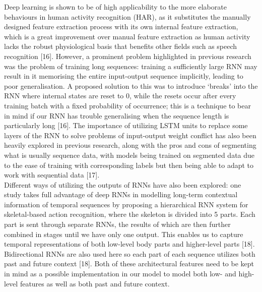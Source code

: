 \documentclass[12pt,twoside]{report}
\begin{document}
\quad Deep learning is shown to be of high applicability to the more elaborate behaviours in human activity recognition (HAR), as it substitutes the manually designed feature extraction process with its own internal feature extraction, which is a great improvement over manual feature extraction as human activity lacks the robust physiological basis that benefits other fields such as speech recognition [16]. However, a prominent problem highlighted in previous research was the problem of training long sequences: training a sufficiently large RNN may result in it memorising the entire input-output sequence implicitly, leading to poor generalisation. A proposed solution to this was to introduce ‘breaks’ into the RNN where internal states are reset to 0, while the resets occur after every training batch with a fixed probability of occurrence; this is a technique to bear in mind if our RNN has trouble generalising when the sequence length is particularly long [16]. The importance of utilizing LSTM units to replace some layers of the RNN to solve problems of input-output weight conflict has also been heavily explored in previous research, along with the pros and cons of segmenting what is usually sequence data, with models being trained on segmented data due to the ease of training with corresponding labels but then being able to adapt to work with sequential data [17].\\

\quad Different ways of utilizing the outputs of RNNs have also been explored: one study takes full advantage of deep RNNs in modelling long-term contextual information of temporal sequences by proposing a hierarchical RNN system for skeletal-based action recognition, where the skeleton is divided into 5 parts. Each part is sent through separate RNNs, the results of which are then further combined in stages until we have only one output. This enables us to capture temporal representations of both low-level body parts and higher-level parts [18]. Bidirectional RNNs are also used here so each part of each sequence utilizes both past and future context [18]. Both of these architectural features need to be kept in mind as a possible implementation in our model to model both low- and high-level features as well as both past and future context.\\
\end{document}
